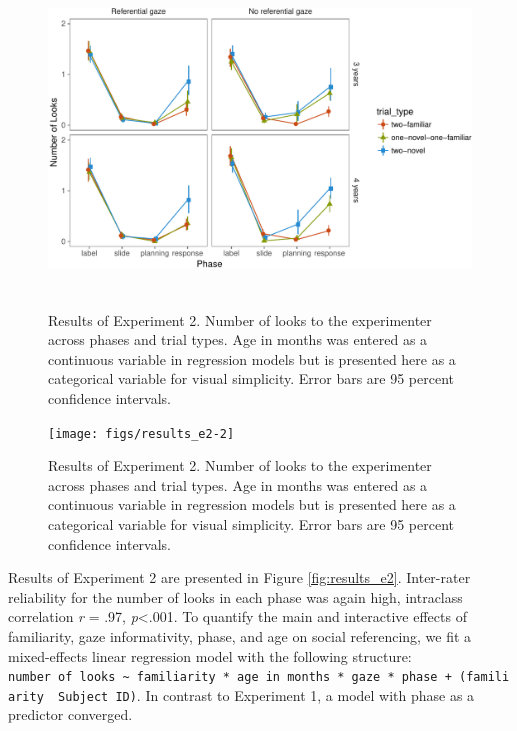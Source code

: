 \documentclass[10pt, letterpaper]{article}
\newenvironment{CodeChunk}{}{}
\begin{document}
\begin{CodeChunk}
\begin{figure}[h]

{\centering \includegraphics[width=5.75in,height=3.5in]{figs/results_e2-1} 

}

\caption[Results of Experiment 2]{Results of Experiment 2. Number of looks to the experimenter across phases and trial types. Age in months was entered as a continuous variable in regression models but is presented here as a categorical variable for visual simplicity. Error bars are 95 percent confidence intervals.}\label{fig:results_e21}
\end{figure}
\begin{figure}[h]

{\centering \texttt{[image: figs/results\_e2-2]} 

}

\caption[Results of Experiment 2]{Results of Experiment 2. Number of looks to the experimenter across phases and trial types. Age in months was entered as a continuous variable in regression models but is presented here as a categorical variable for visual simplicity. Error bars are 95 percent confidence intervals.}\label{fig:results_e22}
\end{figure}
\end{CodeChunk}

Results of Experiment 2 are presented in Figure \ref{fig:results_e2}.
Inter-rater reliability for the number of looks in each phase was again
high, intraclass correlation \emph{r} = .97, \emph{p}\textless{}.001. To
quantify the main and interactive effects of familiarity, gaze
informativity, phase, and age on social referencing, we fit a
mixed-effects linear regression model with the following structure:
\texttt{number\ of\ looks\ \textasciitilde{}\ familiarity\ *\ age\ in\ months\ *\ gaze\ *\ phase\ +\ (familiarity\ \textbar{}\ Subject\ ID)}.
In contrast to Experiment 1, a model with phase as a predictor
converged.
\end{document}
